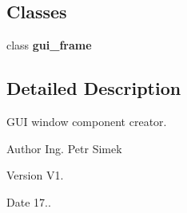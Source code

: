 \subsection*{Classes}
\begin{DoxyCompactItemize}
\item 
class \textbf{ gui\+\_\+frame}
\end{DoxyCompactItemize}


\subsection{Detailed Description}
G\+UI window component creator. 

\begin{DoxyAuthor}{Author}
Ing. Petr Simek 
\end{DoxyAuthor}
\begin{DoxyVersion}{Version}
V1. 
\end{DoxyVersion}
\begin{DoxyDate}{Date}
17.. 
\end{DoxyDate}
